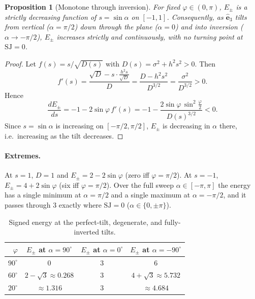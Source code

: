 \documentclass[11pt]{article}
\newtheorem{proposition}{Proposition}
\theoremstyle{definition}
\theoremstyle{remark}
\newcommand{\uv}[1]{\hat{\bm{#1}}}
\newcommand{\Es}{E_{\pm}}
\newcommand{\SJ}{\mathrm{SJ}}
\begin{document}
\begin{proposition}[Monotone through inversion]\label{prop:mono}
For fixed $\varphi\in(0,\pi)$, $\Es$ is a strictly decreasing function of $s=\sin\alpha$ on $[-1,1]$.
Consequently, as $\uv{e}_3$ tilts from vertical ($\alpha=\pi/2$) down through the plane ($\alpha=0$)
and into inversion ($\alpha\to-\pi/2$), $\Es$ increases strictly and continuously, with no
turning point at $\SJ=0$.
\end{proposition}
\begin{proof}
Let $f(s)=s/\sqrt{D(s)}$ with $D(s)=\sigma^2+h^2s^2>0$. Then
\begin{equation}
  f'(s)=\frac{\sqrt{D}-s\cdot\frac{h^2s}{\sqrt{D}}}{D}=\frac{D-h^2s^2}{D^{3/2}}=\frac{\sigma^2}{D^{3/2}}>0.
\end{equation}
Hence
\begin{equation}
  \frac{d\Es}{ds}=-1-2\sin\varphi\,f'(s)=-1-\frac{2\sin\varphi\,\sin^2\frac{\varphi}{2}}{D(s)^{3/2}}<0.
\end{equation}
Since $s=\sin\alpha$ is increasing on $[-\pi/2,\pi/2]$, $\Es$ is decreasing in $\alpha$ there, i.e.\
increasing as the tilt decreases.
\end{proof}

\paragraph{Extremes.} At $s=1$, $D=1$ and $\Es=2-2\sin\varphi$ (zero iff $\varphi=\pi/2$). At $s=-1$,
$\Es=4+2\sin\varphi$ (six iff $\varphi=\pi/2$). Over the full sweep $\alpha\in[-\pi,\pi]$ the energy
has a single minimum at $\alpha=\pi/2$ and a single maximum at $\alpha=-\pi/2$, and it passes
through $3$ exactly where $\SJ=0$ ($\alpha\in\{0,\pm\pi\}$).

\begin{table}[h]
\centering
\begin{tabular}{@{}rccc@{}}
\toprule
$\varphi$ & $\Es$ at $\alpha=90^\circ$ & $\Es$ at $\alpha=0^\circ$ & $\Es$ at $\alpha=-90^\circ$\\
\midrule
$90^\circ$ & $0$ & $3$ & $6$\\
$60^\circ$ & $2-\sqrt3\approx0.268$ & $3$ & $4+\sqrt3\approx5.732$\\
$20^\circ$ & $\approx1.316$ & $3$ & $\approx4.684$\\
\bottomrule
\end{tabular}
\caption{Signed energy at the perfect-tilt, degenerate, and fully-inverted tilts.}
\end{table}
\end{document}
